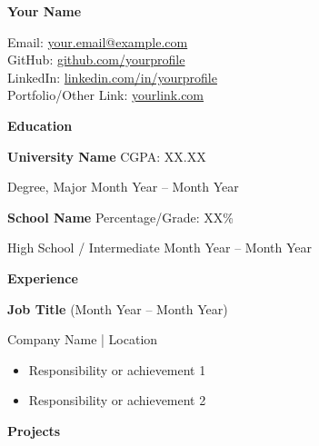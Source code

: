 \documentclass{article}
\begin{document}
{\LARGE \bf Your Name \par}
{\normalsize Email: \href{mailto:your.email@example.com}{your.email@example.com}} \\
\noindent\hfill GitHub: \href{https://github.com/yourprofile}{github.com/yourprofile} \\
{\normalsize LinkedIn: \href{https://linkedin.com/in/yourprofile}{linkedin.com/in/yourprofile}} \\
\noindent\hfill Portfolio/Other Link: \href{https://yourlink.com}{yourlink.com} \\

\vspace{-2mm}

\medskip
\Large {\bf Education} \hrulefill \par
\vspace{1mm}
\normalsize {\bf University Name}\hspace*{\fill} {CGPA: XX.XX} \par
\normalsize {Degree, Major}\hspace*{\fill} {Month Year – Month Year} \par

\normalsize {\bf School Name}\hspace*{\fill} {Percentage/Grade: XX\%} \par
\normalsize {High School / Intermediate}\hspace*{\fill} {Month Year – Month Year} \par

\vspace{1mm}
\medskip
\Large {\bf Experience} \hrulefill \par
\vspace{1mm}

\large {\bf Job Title}\hspace*{\fill} {(Month Year – Month Year)} \par 
\normalsize {Company Name | Location} \par
\vspace{-2mm}
\begin{itemize}[noitemsep]
  \item Responsibility or achievement 1
  \item Responsibility or achievement 2
\end{itemize}

\vspace{1mm}
\medskip
\Large {\bf Projects} \hrulefill \par
\vspace{1mm}
\end{document}
